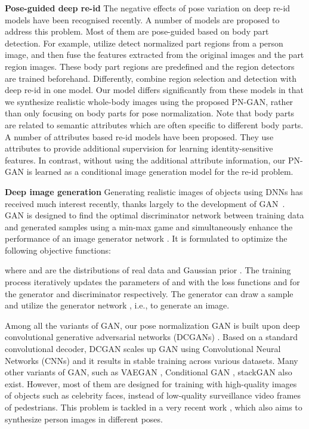 \documentclass[10pt,letterpaper,twocolumn,10pt,letterpaper,twocolumn]{article}
\begin{document}
\noindent \textbf{Pose-guided deep re-id} \quad{}The negative effects
of pose variation on deep re-id models have been recognised recently.
A number of models \cite{su2017pose,zheng2017pose,zhao2017deeply,zhao2017spindle,li2017learning,yao2017deep,wei2017glad}
are proposed to address this problem. Most of them are pose-guided
based on body part detection. For example, \cite{su2017pose,zhao2017spindle}
utilize detect normalized part regions from a person image, and then
fuse the features extracted from the original images and the part
region images. These body part regions are predefined and the region
detectors are trained beforehand. Differently, \cite{zhao2017deeply}
combine region selection and detection with deep re-id in one model.
Our model differs significantly from these models in that we synthesize
realistic whole-body images using the proposed PN-GAN, rather than
only focusing on body parts for pose normalization. Note that body
parts are related to semantic attributes which are often specific to
different body parts. A number of attributes based re-id models \cite{wang2017attribute,sarfraz2017deep,yu2016weakly,deng2015learning}
have been proposed. They use attributes to provide additional supervision
for learning identity-sensitive features. In contrast, without using
the additional attribute information,  our PN-GAN is learned 
as a conditional image generation model for the re-id problem. 

\noindent \textbf{Deep image generation} \quad{}Generating realistic
images of objects using DNNs has received much interest recently,
thanks largely to the development of GAN~\cite{goodfellow2014generative}.
GAN is designed to find the optimal discriminator network  between
training data and generated samples using a min-max game and simultaneously
enhance the performance of an image generator network . It is
formulated to optimize the following objective functions: 

where  and  are
the distributions of real data  and Gaussian prior .
The training process iteratively updates the parameters of  and
 with the loss functions 
and  for the generator and discriminator
respectively. The generator can draw a sample 
and utilize the generator network , i.e.,  to generate
an image.

\noindent Among all the variants of GAN, our pose normalization GAN
is built upon deep convolutional generative adversarial networks (DCGANs)
\cite{radford2015unsupervised}.
Based on a standard convolutional decoder, DCGAN scales up GAN using
Convolutional Neural Networks (CNNs) and it results in stable training
across various datasets. Many other variants of GAN, such as VAEGAN
\cite{larsen2015autoencoding}, Conditional GAN \cite{isola2016image},
stackGAN \cite{zhang2016stackgan} also exist. However, most of
them are designed for training with high-quality images of objects
such as celebrity faces, instead of low-quality surveillance video
frames of pedestrians. This problem is tackled in a very recent work
\cite{poseguid2017nips}, which also aims to synthesize person images
in different poses.
\end{document}
